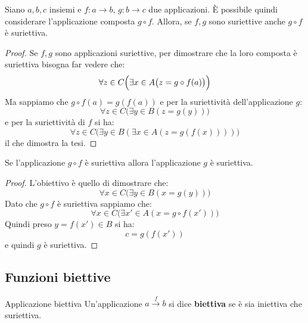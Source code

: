 \begin{propbox}
	Siano $a,b,c$ insiemi e $f: a \longrightarrow b$, $g: b \longrightarrow c$ due applicazioni. È possibile quindi considerare l'applicazione composta $g \circ f$. Allora, se $f,g$ sono suriettive anche $g \circ f$ è suriettiva.
\end{propbox}
\begin{proof}
	Se $f,g$ sono applicazioni suriettive, per dimostrare che la loro composta è suriettiva bisogna far vedere che:
	\begin{displaymath}
		\forall z \in C \Bigl(\exists x \in A \bigl(z=g \circ f (a)\bigr)\Bigr)
	\end{displaymath}
	Ma sappiamo che $g \circ f (a)= g(f(a))$ e per la suriettività dell'applicazione $g$:
	\begin{displaymath}
		\forall z \in C \bigl(\exists y \in B (z=g(y))\bigr)
	\end{displaymath}
	e per la suriettività di $f$ si ha:
	\begin{displaymath}
		\forall z \in C \bigl( \exists y \in B (\exists x \in A (z = g(f(x))))\bigr)
	\end{displaymath}
	il che dimostra la tesi.
\end{proof}

\begin{propbox}
	Se l'applicazione $g \circ f$ è suriettiva allora l'applicazione $g$ è suriettiva.
\end{propbox}

\begin{proof}
	L'obiettivo è quello di dimostrare che:
	\begin{displaymath}
		\forall x \in C \bigl( \exists y \in B (x= g(y))\bigr)
	\end{displaymath}
	Dato che $g \circ f$ è suriettiva sappiamo che:
	\begin{displaymath}
		\forall x \in C \bigl( \exists x' \in A (x = g\circ f(x'))\bigr)
	\end{displaymath}
	Quindi preso $y=f(x') \in B$ si ha:
	\begin{displaymath}
		c = g(f(x'))
	\end{displaymath}
	e quindi $g$ è suriettiva.
\end{proof}

\subsection{Funzioni biettive}
\begin{defbox}{Applicazione biettiva}
	Un'applicazione $a \stackrel{f}{\longrightarrow}b$ si dice \textbf{biettiva} se è sia iniettiva che suriettiva.
\end{defbox}

